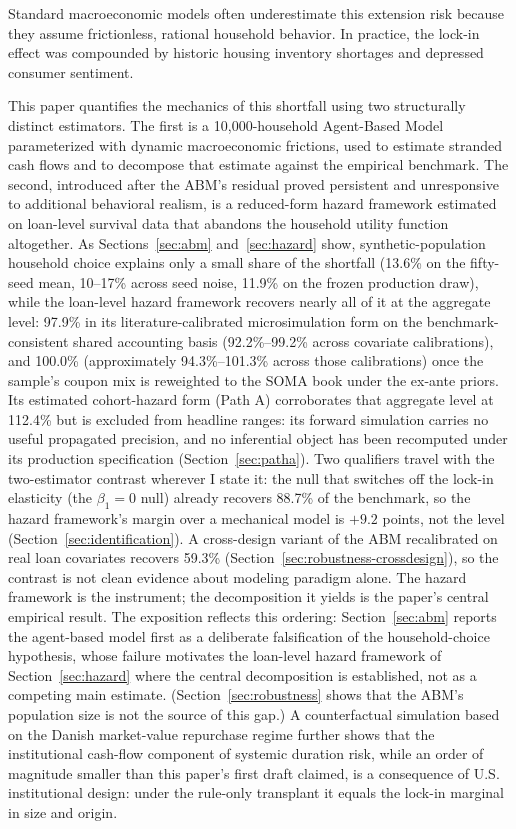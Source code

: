 \documentclass[12pt]{article}
\begin{document}
Standard macroeconomic models often underestimate this extension risk because they assume frictionless, rational household behavior. In practice, the lock-in effect was compounded by historic housing inventory shortages and depressed consumer sentiment.

This paper quantifies the mechanics of this shortfall using two structurally distinct estimators. The first is a 10,000-household Agent-Based Model parameterized with dynamic macroeconomic frictions, used to estimate stranded cash flows and to decompose that estimate against the empirical benchmark. The second, introduced after the ABM's residual proved persistent and unresponsive to additional behavioral realism, is a reduced-form hazard framework estimated on loan-level survival data that abandons the household utility function altogether. As Sections~\ref{sec:abm} and~\ref{sec:hazard} show, synthetic-population household choice explains only a small share of the shortfall (13.6\% on the fifty-seed mean, 10--17\% across seed noise, 11.9\% on the frozen production draw), while the loan-level hazard framework recovers nearly all of it at the aggregate level: 97.9\% in its literature-calibrated microsimulation form on the benchmark-consistent shared accounting basis (92.2\%--99.2\% across covariate calibrations), and 100.0\% (approximately 94.3\%--101.3\% across those calibrations) once the sample's coupon mix is reweighted to the SOMA book under the ex-ante priors. Its estimated cohort-hazard form (Path A) corroborates that aggregate level at 112.4\% but is excluded from headline ranges: its forward simulation carries no useful propagated precision, and no inferential object has been recomputed under its production specification (Section~\ref{sec:patha}). Two qualifiers travel with the two-estimator contrast wherever I state it: the null that switches off the lock-in elasticity (the $\beta_1 = 0$ null) already recovers 88.7\% of the benchmark, so the hazard framework's margin over a mechanical model is $+9.2$ points, not the level (Section~\ref{sec:identification}). A cross-design variant of the ABM recalibrated on real loan covariates recovers 59.3\% (Section~\ref{sec:robustness-crossdesign}), so the contrast is not clean evidence about modeling paradigm alone. The hazard framework is the instrument; the decomposition it yields is the paper's central empirical result. The exposition reflects this ordering: Section~\ref{sec:abm} reports the agent-based model first as a deliberate falsification of the household-choice hypothesis, whose failure motivates the loan-level hazard framework of Section~\ref{sec:hazard} where the central decomposition is established, not as a competing main estimate. (Section~\ref{sec:robustness} shows that the ABM's population size is not the source of this gap.) A counterfactual simulation based on the Danish market-value repurchase regime further shows that the institutional cash-flow component of systemic duration risk, while an order of magnitude smaller than this paper's first draft claimed, is a consequence of U.S. institutional design: under the rule-only transplant it equals the lock-in marginal in size and origin.
\end{document}
